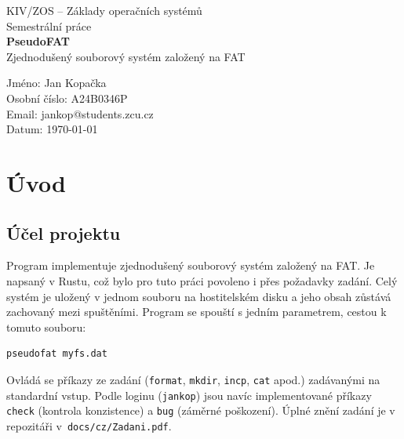 \documentclass[10pt, a4paper]{report}
\newcommand{\code}[1]{\texttt{#1}}
\begin{document}
	\sloppy %
	
	\thispagestyle{empty}
	
	\begin{titlepage}
		\centering
		
		{\Large KIV/ZOS -- Základy operačních systémů} \\[0.5cm]
		{\Large Semestrální práce} \\[2.5cm]
		
		{\huge \bfseries PseudoFAT} \\[0.3cm]
		{\Large Zjednodušený souborový systém založený na FAT} \\[0cm]
		
		\vfill
		
		\begin{flushleft} \small
			Jméno: Jan Kopačka \\
			Osobní číslo: A24B0346P  \\
			Email: jankop@students.zcu.cz \\
			Datum: \today
		\end{flushleft}
		
	\end{titlepage}
	
	\setcounter{page}{2}
	
	\tableofcontents
	\newpage
	
	\chapter{Úvod}
	
	\section{Účel projektu}
	
	Program implementuje zjednodušený souborový systém založený na FAT. Je napsaný v Rustu, což bylo pro tuto práci povoleno i přes požadavky zadání. Celý systém je
	uložený v jednom souboru na hostitelském disku a jeho obsah zůstává zachovaný mezi spuštěními.
	Program se spouští s jedním parametrem, cestou k tomuto souboru:
	
	\begin{lstlisting}
pseudofat myfs.dat
	\end{lstlisting}
	
	Ovládá se příkazy ze zadání (\code{format}, \code{mkdir}, \code{incp}, \code{cat} apod.)
	zadávanými na standardní vstup. Podle loginu (\code{jankop}) jsou navíc implementované příkazy
	\code{check} (kontrola konzistence) a \code{bug} (záměrné poškození). Úplné znění zadání je v repozitáři v~\code{docs/cz/Zadani.pdf}.
	
\end{document}
